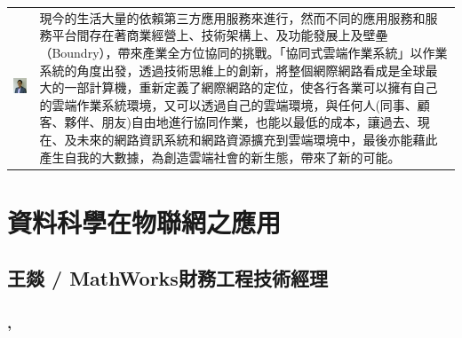 \documentclass[12pt,oneside,a4paper]{book}
\begin{document}
\begin{tabular}{l m{12cm}}
	\begin{minipage}{4.5cm}
		\includegraphics[width=4.2cm]{images/lin.jpeg}    
    \end{minipage}
	&    
現今的生活大量的依賴第三方應用服務來進行，然而不同的應用服務和服務平台間存在著商業經營上、技術架構上、及功能發展上及壁壘（Boundry），帶來產業全方位協同的挑戰。「協同式雲端作業系統」以作業系統的角度出發，透過技術思維上的創新，將整個網際網路看成是全球最大的一部計算機，重新定義了網際網路的定位，使各行各業可以擁有自己的雲端作業系統環境，又可以透過自己的雲端環境，與任何人(同事、顧客、夥伴、朋友)自由地進行協同作業，也能以最低的成本，讓過去、現在、及未來的網路資訊系統和網路資源擴充到雲端環境中，最後亦能藉此產生自我的大數據，為創造雲端社會的新生態，帶來了新的可能。
\end{tabular}

\clearpage

\section*{資料科學在物聯網之應用} 
\subsection*{王燚 / MathWorks財務工程技術經理}
\subsubsection*{\TimeIndustryThree, \LocationIndustryThree}
\end{document}
